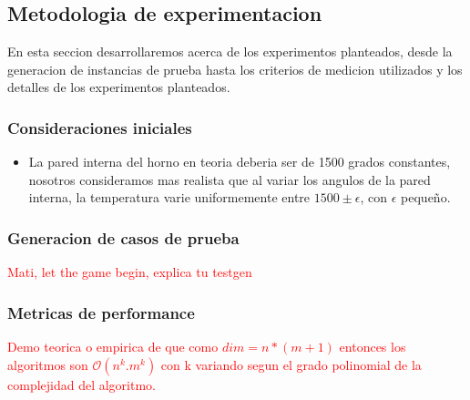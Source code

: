 \subsection{Metodologia de experimentacion}
En esta seccion desarrollaremos acerca de los experimentos planteados, desde la generacion de instancias de prueba hasta los criterios de medicion utilizados y los detalles de los experimentos planteados.
\subsubsection{Consideraciones iniciales}
\begin{itemize}
    \item La pared interna del horno en teoria deberia ser de 1500 grados constantes, nosotros consideramos mas realista que al variar los angulos de la pared interna, la temperatura varie uniformemente entre $1500 \pm \epsilon$, con $\epsilon$ pequeño.
\end{itemize}

\subsubsection{Generacion de casos de prueba}
\textcolor{red}{Mati, let the game begin, explica tu testgen}

\subsubsection{Metricas de performance}
\textcolor{red}{Demo teorica o empirica de que como $dim = n*(m+1)$ entonces los algoritmos son $\mathcal{O}(n^k.m^k)$ con k variando segun el grado polinomial de la complejidad del algoritmo.}

